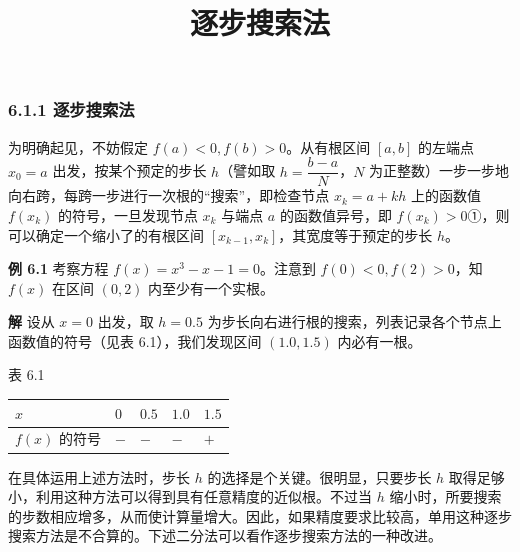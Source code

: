 \documentclass[
  10pt,
  fontset=fandol]{ctexart}
\title{逐步搜索法}
\author{}
\date{}
\newcounter{none} %
\begin{document}
\maketitle

\subsubsection{6.1.1 逐步搜索法}\label{ux9010ux6b65ux641cux7d22ux6cd5}

为明确起见，不妨假定 \(f(a)<0,f(b)>0\)。从有根区间 \([a,b]\) 的左端点 \(x_0=a\) 出发，按某个预定的步长 \(h\)（譬如取 \(h=\dfrac{b-a}{N}\)，\(N\) 为正整数）一步一步地向右跨，每跨一步进行一次根的``搜索''，即检查节点 \(x_k=a+kh\) 上的函数值 \(f(x_k)\) 的符号，一旦发现节点 \(x_k\) 与端点 \(a\) 的函数值异号，即 \(f(x_k)>0\)①，则可以确定一个缩小了的有根区间 \([x_{k-1},x_k]\)，其宽度等于预定的步长 \(h\)。

\textbf{例 6.1} 考察方程 \(f(x)=x^3-x-1=0\)。注意到 \(f(0)<0,f(2)>0\)，知 \(f(x)\) 在区间 \((0,2)\) 内至少有一个实根。

\textbf{解} 设从 \(x=0\) 出发，取 \(h=0.5\) 为步长向右进行根的搜索，列表记录各个节点上函数值的符号（见表 6.1），我们发现区间 \((1.0,1.5)\) 内必有一根。

表 6.1

{\def\LTcaptype{none} %
\begin{longtable}[]{@{}lllll@{}}
\toprule\noalign{}
\(x\) & \(0\) & \(0.5\) & \(1.0\) & \(1.5\) \\
\midrule\noalign{}
\endhead
\bottomrule\noalign{}
\endlastfoot
\(f(x)\) 的符号 & \(-\) & \(-\) & \(-\) & \(+\) \\
\end{longtable}
}

在具体运用上述方法时，步长 \(h\) 的选择是个关键。很明显，只要步长 \(h\) 取得足够小，利用这种方法可以得到具有任意精度的近似根。不过当 \(h\) 缩小时，所要搜索的步数相应增多，从而使计算量增大。因此，如果精度要求比较高，单用这种逐步搜索方法是不合算的。下述二分法可以看作逐步搜索方法的一种改进。
\end{document}
